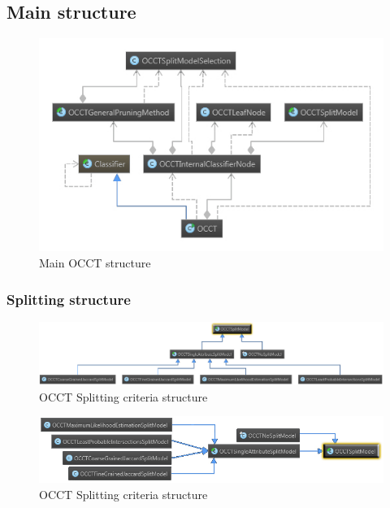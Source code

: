 \documentclass[a4paper,12pt]{article}
\begin{document}
\begin{spacing}{1.5}
\subsection{Main structure}
\begin{figure}[!h]
    \centering
\includegraphics[width=1\textwidth]{Figures/MainStructure}
    \caption{Main OCCT structure}
    \label{fig:mainstr}
\end{figure}

\subsubsection{Splitting structure}
\begin{figure}[!h]
    \centering
\includegraphics[width=1\textwidth]{Figures/OCCTSplitModelStructure}
    \caption{OCCT Splitting criteria structure}
    \label{fig:splitstr}
\end{figure}
\begin{figure}[!h]
    \centering
\includegraphics[width=1\textwidth]{Figures/OCCTSplitModelStructure2}
    \caption{OCCT Splitting criteria structure}
    \label{fig:splitstr}
\end{figure}
\clearpage

\end{spacing}
\end{document}
